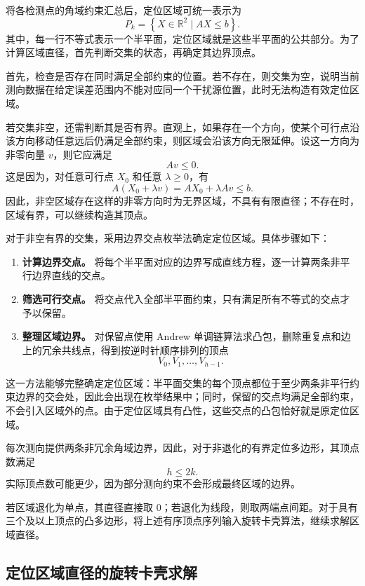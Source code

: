 将各检测点的角域约束汇总后，定位区域可统一表示为
\[
P_k=\left\{X\in\mathbb{R}^2\mid AX\le b\right\}.
\]
其中，每一行不等式表示一个半平面，定位区域就是这些半平面的公共部分。为了计算区域直径，首先判断交集的状态，再确定其边界顶点。

首先，检查是否存在同时满足全部约束的位置。若不存在，则交集为空，说明当前测向数据在给定误差范围内不能对应同一个干扰源位置，此时无法构造有效定位区域。

若交集非空，还需判断其是否有界。直观上，如果存在一个方向，使某个可行点沿该方向移动任意远后仍满足全部约束，则区域会沿该方向无限延伸。设这一方向为非零向量 $v$，则它应满足
\[
Av\le 0.
\]
这是因为，对任意可行点 $X_0$ 和任意 $\lambda\ge 0$，有
\[
A(X_0+\lambda v)
=AX_0+\lambda Av
\le b.
\]
因此，非空区域存在这样的非零方向时为无界区域，不具有有限直径；不存在时，区域有界，可以继续构造其顶点。

对于非空有界的交集，采用边界交点枚举法确定定位区域。具体步骤如下：

\begin{enumerate}
    \item \textbf{计算边界交点。}
    将每个半平面对应的边界写成直线方程，逐一计算两条非平行边界直线的交点。

    \item \textbf{筛选可行交点。}
    将交点代入全部半平面约束，只有满足所有不等式的交点才予以保留。

    \item \textbf{整理区域边界。}
    对保留点使用 Andrew 单调链算法求凸包，删除重复点和边上的冗余共线点，得到按逆时针顺序排列的顶点
    \[
    V_0,V_1,\ldots,V_{h-1}.
    \]
\end{enumerate}

这一方法能够完整确定定位区域：半平面交集的每个顶点都位于至少两条非平行约束边界的交会处，因此会出现在枚举结果中；同时，保留的交点均满足全部约束，不会引入区域外的点。由于定位区域具有凸性，这些交点的凸包恰好就是原定位区域。

每次测向提供两条非冗余角域边界，因此，对于非退化的有界定位多边形，其顶点数满足
\[
h\le 2k.
\]
实际顶点数可能更少，因为部分测向约束不会形成最终区域的边界。

若区域退化为单点，其直径直接取 $0$；若退化为线段，则取两端点间距。对于具有三个及以上顶点的凸多边形，将上述有序顶点序列输入旋转卡壳算法，继续求解区域直径。

\subsection{定位区域直径的旋转卡壳求解}
\label{sec:p1-calipers}

